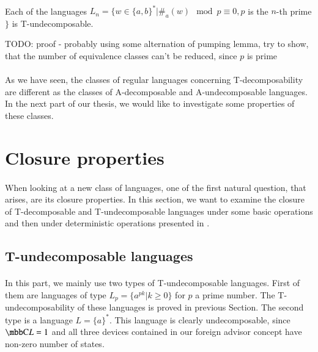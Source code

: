 \paragraph{}
\dokaz Each of the languages $L_{n} = \{ w \in \{ a, b\}^* | \#_{a}(w) \mod p \equiv 0, p$ is the $n$-th prime$\}$ is T-undecomposable.

\color{red}TODO: proof - probably using some alternation of pumping lemma, try to show, that the number of equivalence classes can't be reduced, since  $p$ is prime\color{black}\\
\square

\paragraph{}
As we have seen, the classes of regular languages concerning T-decomposability are different as the classes of A-decomposable and A-undecomposable languages. In the next part of our thesis, we would like to investigate some properties of these classes.

\section{Closure properties}

\paragraph{}
When looking at a new class of languages, one of the first natural question, that arises, are its closure properties.  In this section, we want to examine the closure of T-decomposable and T-undecomposable languages under some basic operations and then under deterministic operations presented in \cite{AFDL}.

\subsection{T-undecomposable languages}
\paragraph{}
In this part, we mainly use two types of T-undecomposable languages. First of them are languages of type $L_p = \{ a^{pk} | k \geq 0 \}$ for $p$ a prime number. The T-undecomposability of these languages is proved in previous Section. The second type is a language $L = \{ a \}^*$. This language is clearly undecomposable, since $\C{L} = 1$ and all three devices contained in our foreign advisor concept have non-zero number of states.

